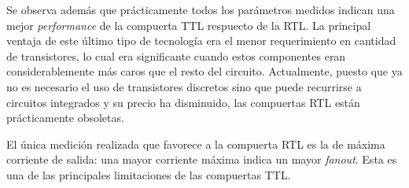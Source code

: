 \documentclass[../../e3_tp2_main.tex]{subfiles}
\begin{document}
Se observa adem\'as que pr\'acticamente todos los par\'ametros medidos indican una mejor \textit{performance} de la compuerta TTL respuecto de la RTL. La principal ventaja de este \'ultimo tipo de tecnolog\'ia era el menor requerimiento en cantidad de transistores, lo cual era significante cuando estos componentes eran considerablemente m\'as caros que el resto del circuito. Actualmente, puesto que ya no es necesario el uso de transistores discretos sino que puede recurrirse a circuitos integrados y su precio ha disminuido, las compuertas RTL est\'an pr\'acticamente obsoletas. \par 

El \'unica medici\'on realizada que favorece a la compuerta RTL es la de m\'axima corriente de salida: una mayor corriente m\'axima indica un mayor \textit{fanout}. Esta es una de las principales limitaciones de las compuertas TTL.
\end{document}
